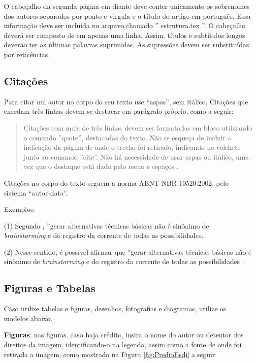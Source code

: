 \documentclass[a4paper,11pt,oneside,onecolumn,final]{article}
\begin{document}
O cabeçalho da segunda página em diante deve conter unicamente os sobrenomes dos autores separados por ponto e vírgula e o título do artigo em português. Essa informação deve ser incluída no arquivo chamado '' estrutura.tex ''. O cabeçalho deverá ser composto de em apenas uma linha. Assim, títulos e subtítulos longos deverão ter as últimas palavras suprimidas. As supressões devem ser substituídas por reticências. 

\subsection{Citações}

Para citar um autor no corpo do seu texto use “aspas”, sem itálico. Citações que excedam três linhas devem se destacar em parágrafo próprio, como a seguir:

\begin{quote}
    Citações com mais de três linhas devem ser formatadas em bloco utilizando o comando ''quote'', destacadas do texto. Não se esqueça de incluir a indicação da página de onde o trecho foi retirado, indicando no colchete junto ao comando ''cite''. Não há necessidade de usar aspas ou itálico, uma vez que o destaque está dado pelo recuo e espaços \cite[p. 1]{bonsiepe_teoria_1993}.

\end{quote}
Citações no corpo do texto seguem a norma ABNT NBR 10520:2002. pelo sistema “autor-data”. 

Exemplos: 

(1)
Segundo , ''gerar alternativas técnicas básicas não é sinônimo de \textit{brainstorming} e do registro da corrente de todas as possibilidades.

(2)
Nesse sentido, é possível afirmar que ''gerar alternativas técnicas básicas não é sinônimo de \textit{brainstorming} e do registro da corrente de todas as possibilidades \cite[p. 9]{bonsiepe_metodologia_1984}.  


\subsection{Figuras e Tabelas}

Caso utilize tabelas e figuras, desenhos, fotografias e diagramas, utilize os modelos abaixo.

\textbf{Figuras}: nas figuras, caso haja crédito, insira o nome do autor ou detentor dos direitos da imagem, identificando-o na legenda, assim como a fonte de onde foi retirada a imagem, como mostrado na Figura \ref{fig:PredioEsdi} a seguir:
\end{document}
